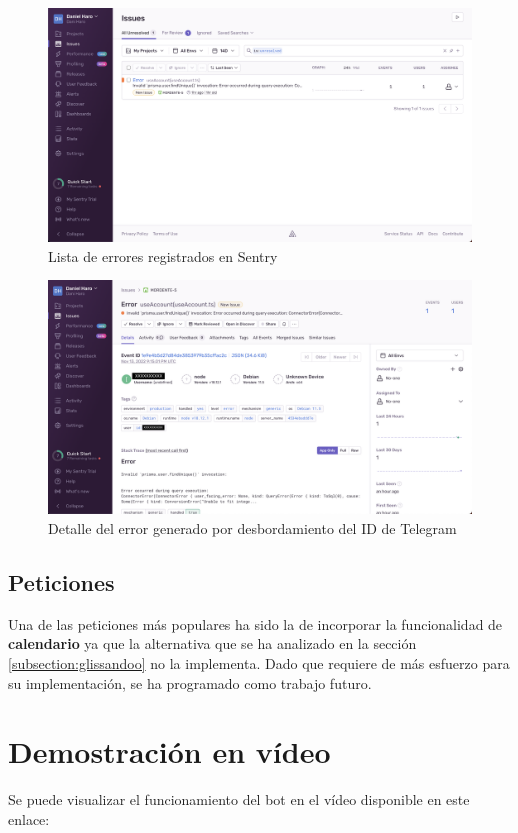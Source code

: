 \begin{figure}[h]
\centering
\includegraphics[width=\textwidth]{imagenes/pruebas/sentry_error_uid.png}
\caption{Lista de errores registrados en Sentry}
\label{fig:sentryListaErrores}
\end{figure}

\begin{figure}[h]
\centering
\includegraphics[width=\textwidth]{imagenes/pruebas/sentry_detalle_error_uid.png}
\caption{Detalle del error generado por desbordamiento del ID de Telegram}
\label{fig:sentryDetalleError}
\end{figure}

\subsection{Peticiones}

Una de las peticiones más populares ha sido la de incorporar la funcionalidad de \textbf{calendario} ya que la alternativa que se ha analizado en la sección \ref{subsection:glissandoo} no la implementa. Dado que requiere de más esfuerzo para su implementación, se ha programado como trabajo futuro.


\section{Demostración en vídeo}

Se puede visualizar el funcionamiento del bot en el vídeo disponible en este enlace:
\url{}

